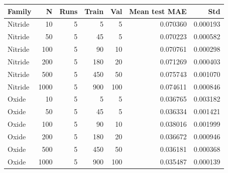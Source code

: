 \begin{tabular}{lrrrrrr}
\toprule
Family & N & Runs & Train & Val & Mean test MAE & Std \\
\midrule
Nitride & 10 & 5 & 5 & 5 & 0.070360 & 0.000193 \\
Nitride & 50 & 5 & 45 & 5 & 0.070223 & 0.000582 \\
Nitride & 100 & 5 & 90 & 10 & 0.070761 & 0.000298 \\
Nitride & 200 & 5 & 180 & 20 & 0.071269 & 0.000403 \\
Nitride & 500 & 5 & 450 & 50 & 0.075743 & 0.001070 \\
Nitride & 1000 & 5 & 900 & 100 & 0.074611 & 0.000846 \\
Oxide & 10 & 5 & 5 & 5 & 0.036765 & 0.003182 \\
Oxide & 50 & 5 & 45 & 5 & 0.036334 & 0.001421 \\
Oxide & 100 & 5 & 90 & 10 & 0.038016 & 0.001999 \\
Oxide & 200 & 5 & 180 & 20 & 0.036672 & 0.000946 \\
Oxide & 500 & 5 & 450 & 50 & 0.036181 & 0.000368 \\
Oxide & 1000 & 5 & 900 & 100 & 0.035487 & 0.000139 \\
\bottomrule
\end{tabular}
